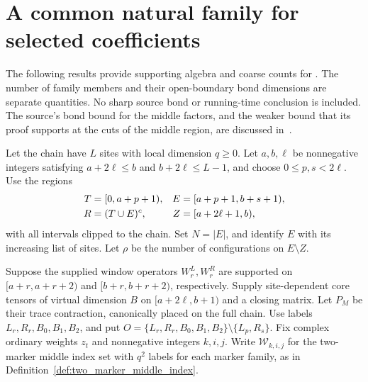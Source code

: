 \section{A common natural family for selected coefficients}

The following results provide supporting algebra and coarse counts for
\cite[Proposition~5.7]{Arad2016RigorousRG}.
The number of family members and their open-boundary bond dimensions are
separate quantities. No sharp source bond or running-time conclusion is
included. The source's bond bound for the middle factors, and the weaker
bound that its proof supports at the cuts of the middle region, are
discussed in~\cite{gap:alvv16_chebyshev_middle_bond}.

\begin{lemma}
    \label{thm:selected_common_natural_mpo_family}
    \leanok
    Let the chain have $L$ sites with local dimension $q\ge0$.
    Let $a,b,\ell$ be nonnegative integers satisfying
    $a+2\ell\le b$ and $b+2\ell\le L-1$, and choose $0\le p,s<2\ell$.
    Use the regions
    \begin{align}
        T & ={[0,a+p+1)}, & E &
        ={[a+p+1,b+s+1)},\notag                 \\
        R & =(T\cup E)^c, & Z & =[a+2\ell+1,b),
        \label{eq:selected_common_natural_regions}
    \end{align}
    with all intervals clipped to the chain. Set $N=|E|$, and identify $E$
    with its increasing list of sites. Let $\rho$ be the number of
    configurations on $E\setminus Z$.

    Suppose the supplied window operators $W^L_r,W^R_r$ are supported on
    $[a+r,a+r+2)$ and
    $[b+r,b+r+2)$, respectively.
    Supply site-dependent core tensors of virtual dimension $B$ on
    $[a+2\ell,b+1)$ and a closing matrix. Let $P_M$ be their trace contraction,
    canonically placed on the full chain.
    Use labels $L_r,R_r,B_0,B_1,B_2$, and put
    $O=\{L_r,R_r,B_0,B_1,B_2\}\setminus\{L_p,R_s\}$.
    Fix complex ordinary weights $z_t$ and nonnegative integers $k,i,j$.
    Write $\mathcal W_{k,i,j}$ for the two-marker middle index set with
    $q^2$ labels for each marker family, as in
    Definition~\ref{def:two_marker_middle_index}.


\end{lemma}
